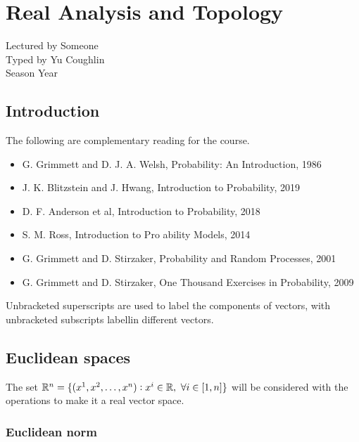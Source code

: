 \documentclass[../Year2.tex]{subfiles}
\begin{document}
\chapter*{Real Analysis and Topology}
\renewcommand*\thesection{\arabic{section}}
Lectured by Someone \\ Typed by Yu Coughlin \\
Season Year

\section*{Introduction}

The following are complementary reading for the course.
\begin{itemize}
    \item G. Grimmett and D. J. A. Welsh, Probability: An Introduction, 1986
    \item J. K. Blitzstein and J. Hwang, Introduction to Probability, 2019
    \item D. F. Anderson et al, Introduction to Probability, 2018
    \item S. M. Ross, Introduction to Pro ability Models, 2014
    \item G. Grimmett and D. Stirzaker, Probability and Random Processes, 2001
    \item G. Grimmett and D. Stirzaker, One Thousand Exercises in Probability, 2009
\end{itemize}

\begin{notation*}
    Unbracketed superscripts are used to label the components of vectors, with unbracketed subscripts labellin different vectors.
\end{notation*}

\tableofcontents\pagebreak



\section{Euclidean spaces}

\begin{definition}[$\RR^n$]
    The set $\mathbb{R}^n=\{(x^1,x^2,\ldots,x^n):x^i\in\mathbb{R}, \ \forall i\in[1,n]\}$ will be considered with the operations to make it a real vector space.
\end{definition}

\subsection{Euclidean norm}
\end{document}
